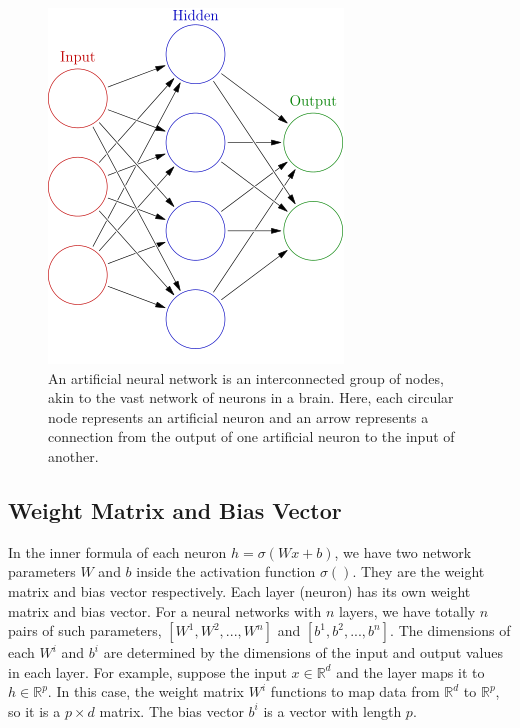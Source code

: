 \documentclass[12pt]{report} %
\begin{document}
\begin{figure}[H]
	\centering
	\includegraphics[scale=0.6]{pictures/neural_network.png}
	\caption{An artificial neural network is an interconnected group of nodes, akin to the vast network of neurons in a brain. Here, each circular node represents an artificial neuron and an arrow represents a connection from the output of one artificial neuron to the input of another\cite{NNPIC}.}
	\label{fig:1}
\end{figure}

\subsection{Weight Matrix and Bias Vector}
In the inner formula of each neuron $h=\sigma(Wx+b)$, we have two network parameters $W$ and $b$ inside the activation function $\sigma()$. They are the weight matrix and bias vector respectively. Each layer (neuron) has its own weight matrix and bias vector. For a neural networks with $n$ layers, we have totally $n$ pairs of such parameters, $[W^1, W^2,...,W^n]$ and $[b^1,b^2,...,b^n]$. The dimensions of each $W^i$ and $b^i$ are determined by the dimensions of the input and output values in each layer. For example, suppose the input \(x\in \mathbb{R}^{d}\) and the layer maps it to \(h\in \mathbb{R}^{p}\). In this case, the weight matrix $W^i$ functions to map data from $\mathbb{R}^{d}$ to $\mathbb{R}^{p}$, so it is a $p \times d$ matrix. The bias vector $b^i$ is a vector with length $p$.
\end{document}
